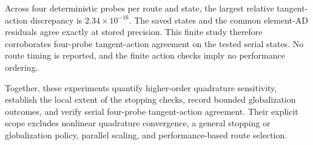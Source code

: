 Across four deterministic probes per route and state, the largest relative
tangent-action discrepancy is $2.34\times10^{-16}$. The saved states and the
common element-AD residuals agree exactly at stored precision. This finite study
therefore corroborates four-probe tangent-action agreement on the tested serial
states. No route timing is reported, and the finite action checks imply no
performance ordering.

Together, these experiments quantify higher-order quadrature sensitivity,
establish the local extent of the stopping checks, record bounded globalization
outcomes, and verify serial four-probe tangent-action agreement. Their explicit
scope excludes
nonlinear quadrature convergence, a general stopping or globalization policy,
parallel scaling, and performance-based route selection.

\FloatBarrier
